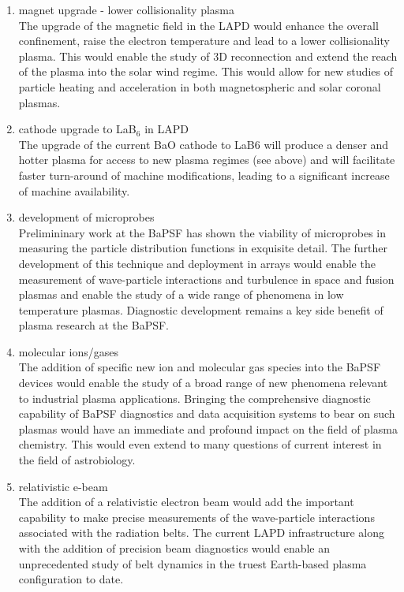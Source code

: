 \documentclass[11pt]{article}
\begin{document}
\begin{enumerate}

\item magnet upgrade - lower collisionality plasma\\
The upgrade of the magnetic field in the LAPD would enhance the overall confinement,
raise the electron temperature and lead to a lower collisionality plasma. This would
enable the study of 3D reconnection and extend the reach of the plasma into the solar
wind regime. This would allow for new studies of particle heating and acceleration in
both magnetospheric and solar coronal plasmas.

\item cathode upgrade to LaB$_{6}$ in LAPD \\
The upgrade of the current BaO cathode to LaB6 will produce a denser and hotter plasma
for access to new plasma regimes (see above) and will facilitate faster turn-around of
machine modifications, leading to a significant increase of machine availability.

\item development of microprobes \\
Prelimininary work at the BaPSF has shown the viability of microprobes in measuring
the particle distribution functions in exquisite detail. The further development of this
technique and deployment in arrays would enable the measurement of wave-particle
interactions and turbulence in space and fusion plasmas and enable the study of a wide
range of phenomena in low temperature plasmas. Diagnostic development remains a
key side benefit of plasma research at the BaPSF.

\item molecular ions/gases \\
The addition of specific new ion and molecular gas species into the BaPSF devices
would enable the study of a broad range of new phenomena relevant to industrial plasma
applications. Bringing the comprehensive diagnostic capability of BaPSF diagnostics
and data acquisition systems to bear on such plasmas would have an immediate and
profound impact on the field of plasma chemistry. This would even extend to many
questions of current interest in the field of astrobiology.

\item relativistic e-beam\\
The addition of a relativistic electron beam would add the important capability to make
precise measurements of the wave-particle interactions associated with the radiation
belts. The current LAPD infrastructure along with the addition of precision beam
diagnostics would enable an unprecedented study of belt dynamics in the truest Earth-based
plasma configuration to date.


\end{enumerate}
\end{document}
